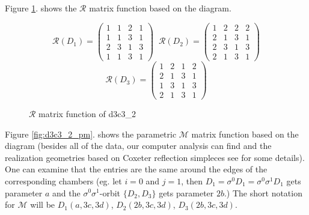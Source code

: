 \documentclass[12pt,a4paper]{article}
\numberwithin{equation}{section}
\theoremstyle{plain}%
\theoremstyle{definition}
\theoremstyle{remark}
\begin{document}
Figure \ref{fig:d3c3_2_r}. shows the $\mathcal{R}$ matrix function based on the
diagram.%

\begin{figure}
  \caption{\label{fig:d3c3_2_r} $\mathcal{R}$ matrix function of d3c3\_2}
  \begin{equation*}
    \mathcal{R}(D_1)=
    \left(
    \begin{array}{cccc}
      1 & 1 & 2 & 1\\
      1 & 1 & 3 & 1\\
      2 & 3 & 1 & 3\\
      1 & 1 & 3 & 1
    \end{array}
    \right)\;\;
    \mathcal{R}(D_2)=
    \left(
    \begin{array}{cccc}
      1 & 2 & 2 & 2\\
      2 & 1 & 3 & 1\\
      2 & 3 & 1 & 3\\
      2 & 1 & 3 & 1
    \end{array}
    \right)
  \end{equation*}
  \begin{equation*}
    \mathcal{R}(D_3)=
    \left(
    \begin{array}{cccc}
      1 & 2 & 1 & 2\\
      2 & 1 & 3 & 1\\
      1 & 3 & 1 & 3\\
      2 & 1 & 3 & 1
    \end{array}
    \right)
  \end{equation*}
\end{figure}

Figure \ref{fig:d3c3_2_pm}. shows the parametric $\mathcal{M}$ matrix function
based on the diagram (besides all of the data, our computer analysis can find
and the realization geometries based on Coxeter reflection simpleces see
\cite{M96} for some details). 
One can examine that the entries are the same around the
edges of the corresponding chambers (eg. let $i=0$ and $j=1$, then
$D_1=\sigma^0D_1=\sigma^0\sigma^1D_1$ gets parameter $a$ and the
$\sigma^0\sigma^1$-orbit $\{D_2,D_3\}$ gets parameter $2b$.) The short notation
for $\mathcal{M}$ will be $D_1(a,3c,3d)$, $D_2(2b,3c,3d)$, $D_3(2b,3c,3d)$. 
\end{document}
